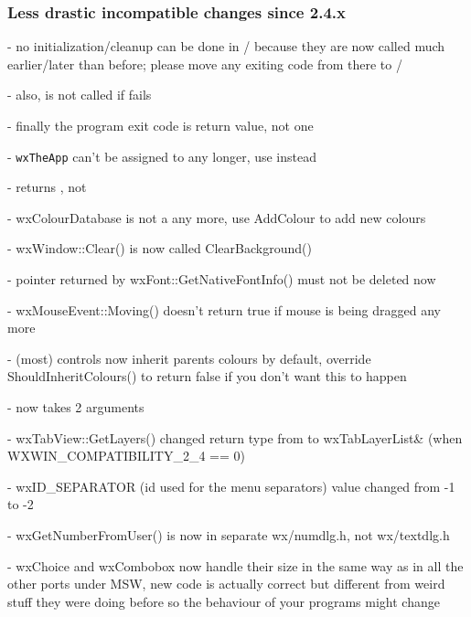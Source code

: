 \subsubsection{Less drastic incompatible changes since 2.4.x}\label{24incompatiblelessdrastic}

- no initialization/cleanup can be done in / because they are
  now called much earlier/later than before; please move any exiting code
  from there to /

- also,  is not called if  fails

- finally the program exit code is  return value, not  one

- \texttt{wxTheApp} can't be assigned to any longer, use  instead

-  returns , not 

- wxColourDatabase is not a  any more, use AddColour to add new colours

- wxWindow::Clear() is now called ClearBackground()

- pointer returned by wxFont::GetNativeFontInfo() must not be deleted now

- wxMouseEvent::Moving() doesn't return true if mouse is being dragged any more

- (most) controls now inherit parents colours by default, override
  ShouldInheritColours() to return false if you don't want this to happen

-  now takes 2 arguments

- wxTabView::GetLayers() changed return type from  to wxTabLayerList&
  (when WXWIN\_COMPATIBILITY\_2\_4 == 0)

- wxID\_SEPARATOR (id used for the menu separators) value changed from -1 to -2

- wxGetNumberFromUser() is now in separate wx/numdlg.h, not wx/textdlg.h

- wxChoice and wxCombobox now handle their size in the same way as in all the
  other ports under MSW, new code is actually correct but different from weird
  stuff they were doing before so the behaviour of your programs might change


